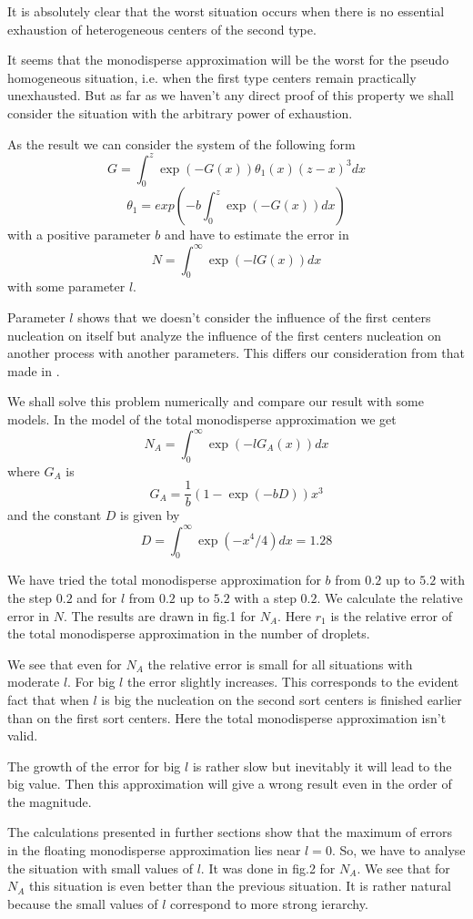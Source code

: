 It is absolutely clear that the worst situation occurs when there is no
essential
exhaustion of heterogeneous centers of the second type.

It seems that the monodisperse approximation will be the worst for the
pseudo homogeneous  situation, i.e. when the first type centers remain
practically
unexhausted. But as far as we haven't any direct proof of this property we
shall consider the situation with the arbitrary power of exhaustion.

As the result we can consider the system of the following form
$$
G = \int_0^z \exp(-G(x)) \theta_1(x) (z-x)^3 dx
$$
$$
\theta_1 = exp(-b \int_0^z \exp(-G(x)) dx)
$$
with a positive parameter $b$ and
have to estimate the error in
$$
N = \int_0^{\infty} \exp(-l G(x)) dx
$$
with some parameter $l$.


Parameter $l$ shows that we doesn't consider the influence  of the first
centers nucleation on itself but analyze the influence of the first centers
nucleation on another process with another parameters. This differs our
consideration from that made in \cite{Pavlov-uni}.

We shall solve this problem numerically  and compare our result with some
models. In the model of the total monodisperse approximation we get
$$
N_A = \int_0^{\infty} \exp(-l G_A(x)) dx
$$
where
$G_A$ is
$$
G_A = \frac{1}{b} (1 - \exp(-b D)) x^3
$$
and the constant $D$ is given by
$$
D = \int_0^{\infty} \exp(-x^4 /4) dx = 1.28
$$




We have tried the total monodisperse approximation
for $b$ from $0.2$ up to $5.2$
with the step $0.2$ and for $l$ from $0.2$ up to $5.2$ with a step $0.2$.
We calculate the relative error in $N$. The results are drawn in fig.1
for $N_A$.    Here  $r_1$  is  the  relative  error  of  the  total
monodisperse
approximation in the number of droplets.

We see that even for $N_A$ the relative error is small for all situations
with moderate $l$. For big  $l$ the error slightly increases. This corresponds
to the evident fact that when $l$ is big the nucleation on the second
sort centers is finished earlier than on the first sort centers. Here
the total monodisperse approximation isn't valid.

The growth of the error for big $l$ is rather slow but inevitably it will
lead to
 the big  value. Then
this approximation will give a wrong result even in the
order of the magnitude.

The calculations presented in  further sections show that the
 maximum of errors in the floating monodisperse approximation
lies near $l=0$. So, we have
to analyse the situation with small values of $l$. It was done in fig.2
for $N_A$.
We see that for $N_A$ this situation is even better than the previous
situation. It is rather natural because the  small  values of $l$ correspond
to more strong ierarchy.


